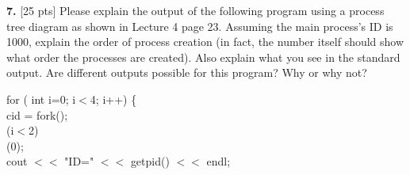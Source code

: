 \documentclass[12pt]{article}
\newcommand\tab[1][1cm]{\hspace*{#1}}
\begin{document}
{\bf 7.} [25 pts] Please explain the output of the following program using a process tree diagram as shown in Lecture 4 page 23. Assuming the main process's ID is 1000, explain the order of process creation (in fact, the number itself should show what order the processes are created). Also explain what you see in the standard output. Are different outputs possible for this program? Why or why not? 

\noindent
{\color{violet} for} ({\color{blue} int} i={\color{Green}0}; i$<${\color{Green}4}; i++) \{\\
\tab{\color{blue}int} cid = {\color{RawSienna}fork}();\\
\tab{\color{violet}if}(i$<${\color{Green}2})\\
\tab\tab{\color{RawSienna}wait}({\color{Green}0});\\
\tab cout $<<$ {\color{Maroon}"ID="} $<<$ {\color{RawSienna}getpid}() $<<$ endl;\\
\end{document}
